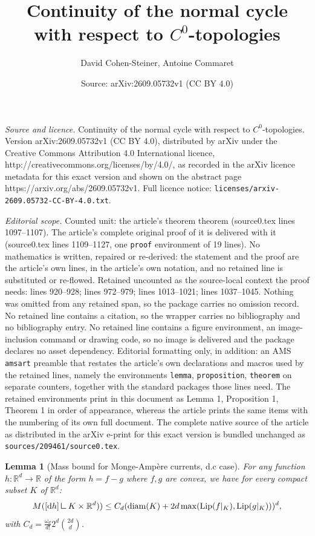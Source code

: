 \documentclass[10pt,a4paper]{amsart}
\title{Continuity of the normal cycle with respect to $C^0$-topologies}
\author{David Cohen-Steiner, Antoine Commaret}
\date{Source: arXiv:2609.05732v1 (CC BY 4.0)}
\newtheorem{lemma}{Lemma}
\newcommand{\R}{\mathbb{R}}
\DeclareMathOperator{\diam}{\mathrm{diam}}
\DeclareMathOperator{\diff}{\mathrm{d} \!}
\DeclareMathOperator{\lip}{\mathrm{Lip}}
\newcommand{\mres}{\mathbin{\vrule height 1.6ex depth 0pt width 0.13ex\vrule height 0.13ex depth 0pt width 1.3ex}}
\begin{document}
\maketitle

\noindent\emph{Source and licence.} Continuity of the normal cycle with respect to $C^0$-topologies. Version arXiv:2609.05732v1 (CC BY 4.0), distributed by arXiv under the Creative Commons Attribution 4.0 International licence, http://creativecommons.org/licenses/by/4.0/, as recorded in the arXiv licence metadata for this exact version and shown on the abstract page https://arxiv.org/abs/2609.05732v1. Full licence notice: \texttt{licenses/arxiv-2609.05732-CC-BY-4.0.txt}.\par\smallskip

\noindent\textit{Editorial scope.} Counted unit: the article's theorem theorem (source0.tex lines 1097--1107). The article's complete original proof of it is delivered with it (source0.tex lines 1109--1127, one \texttt{proof} environment of 19 lines). No mathematics is written, repaired or re-derived: the statement and the proof are the article's own lines, in the article's own notation, and no retained line is substituted or re-flowed.  Retained uncounted as the source-local context the proof needs: lines 920--928; lines 972--979; lines 1013--1021; lines 1037--1045.  Nothing was omitted from any retained span, so the package carries no omission record.  No retained line contains a citation, so the wrapper carries no bibliography and no bibliography entry.  No retained line contains a figure environment, an image-inclusion command or drawing code, so no image is delivered and the package declares no asset dependency.  Editorial formatting only, in addition: an AMS \texttt{amsart} preamble that restates the article's own declarations and macros used by the retained lines, namely the environments \texttt{lemma}, \texttt{proposition}, \texttt{theorem} on separate counters, together with the standard packages those lines need.  The retained environments print in this document as Lemma 1, Proposition 1, Theorem 1 in order of appearance, whereas the article prints the same items with the numbering of its own full document.  The complete native source of the article as distributed in the arXiv e-print for this exact version is bundled unchanged as \texttt{sources/209461/source0.tex}.
    \begin{lemma}[Mass bound for Monge-Ampère currents, d.c case]
    \label{lem:ma_bound}
    For any function $h : \R^d \to \R$ of the form $h=f-g$ where $f,g$ are convex, we have for every compact subset $K$ of $\R^d$:
    \begin{equation*}
    \label{eq:mineurs}
        M([\diff h] \mres K \times \R^d)) \leq C_d (\diam(K) + 2d\max(\lip(f|_K),\lip(g|_K)))^d,
    \end{equation*}
    with $C_d = \frac{\omega_d}{d!}2^d \binom{2d}{d}$.
    \end{lemma}
\end{document}
